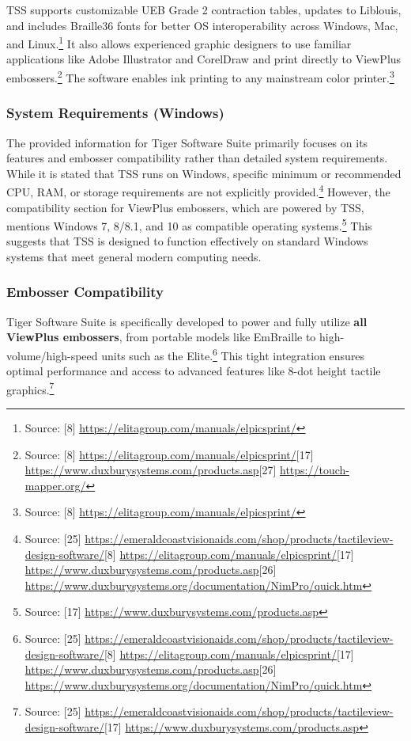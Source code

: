 TSS supports customizable UEB Grade 2 contraction tables, updates to Liblouis, and includes Braille36 fonts for better OS interoperability across Windows, Mac, and Linux.\footnote{Source: [8] \url{https://elitagroup.com/manuals/elpicsprint/}} It also allows experienced graphic designers to use familiar applications like Adobe Illustrator and CorelDraw and print directly to ViewPlus embossers.\footnote{Source: [8] \url{https://elitagroup.com/manuals/elpicsprint/}[17] \url{https://www.duxburysystems.com/products.asp}[27] \url{https://touch-mapper.org/}} The software enables ink printing to any mainstream color printer.\footnote{Source: [8] \url{https://elitagroup.com/manuals/elpicsprint/}}

\subsubsection{System Requirements (Windows)}

The provided information for Tiger Software Suite primarily focuses on its features and embosser compatibility rather than detailed system requirements. While it is stated that TSS runs on Windows, specific minimum or recommended CPU, RAM, or storage requirements are not explicitly provided.\footnote{Source: [25] \url{https://emeraldcoastvisionaids.com/shop/products/tactileview-design-software/}[8] \url{https://elitagroup.com/manuals/elpicsprint/}[17] \url{https://www.duxburysystems.com/products.asp}[26] \url{https://www.duxburysystems.org/documentation/NimPro/quick.htm}} However, the compatibility section for ViewPlus embossers, which are powered by TSS, mentions Windows 7, 8/8.1, and 10 as compatible operating systems.\footnote{Source: [17] \url{https://www.duxburysystems.com/products.asp}} This suggests that TSS is designed to function effectively on standard Windows systems that meet general modern computing needs.

\subsubsection{Embosser Compatibility}

Tiger Software Suite is specifically developed to power and fully utilize \textbf{all ViewPlus embossers}, from portable models like EmBraille to high-volume/high-speed units such as the Elite.\footnote{Source: [25] \url{https://emeraldcoastvisionaids.com/shop/products/tactileview-design-software/}[8] \url{https://elitagroup.com/manuals/elpicsprint/}[17] \url{https://www.duxburysystems.com/products.asp}[26] \url{https://www.duxburysystems.org/documentation/NimPro/quick.htm}} This tight integration ensures optimal performance and access to advanced features like 8-dot height tactile graphics.\footnote{Source: [25] \url{https://emeraldcoastvisionaids.com/shop/products/tactileview-design-software/}[17] \url{https://www.duxburysystems.com/products.asp}}

